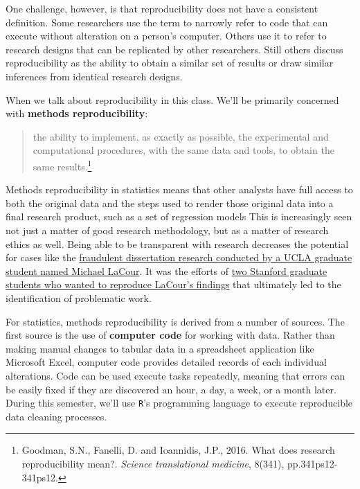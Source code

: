 \documentclass[]{book}
\let\rmarkdownfootnote\footnote%
\def\footnote{\protect\rmarkdownfootnote}
\theoremstyle{definition}
\theoremstyle{definition}
\theoremstyle{definition}
\theoremstyle{remark}
\begin{document}
One challenge, however, is that reproducibility does not have a
consistent definition. Some researchers use the term to narrowly refer
to code that can execute without alteration on a person's computer.
Others use it to refer to research designs that can be replicated by
other researchers. Still others discuss reproducibility as the ability
to obtain a similar set of results or draw similar inferences from
identical research designs.

When we talk about reproducibility in this class. We'll be primarily
concerned with \textbf{methods reproducibility}:

\begin{quote}
the ability to implement, as exactly as possible, the experimental and
computational procedures, with the same data and tools, to obtain the
same results.\footnote{Goodman, S.N., Fanelli, D. and Ioannidis, J.P.,
  2016. What does research reproducibility mean?. \emph{Science
  translational medicine}, 8(341), pp.341ps12-341ps12.}
\end{quote}

Methods reproducibility in statistics means that other analysts have
full access to both the original data and the steps used to render those
original data into a final research product, such as a set of regression
models This is increasingly seen not just a matter of good research
methodology, but as a matter of research ethics as well. Being able to
be transparent with research decreases the potential for cases like the
\href{http://nymag.com/scienceofus/2015/05/how-a-grad-student-uncovered-a-huge-fraud.html}{fraudulent
dissertation research conducted by a UCLA graduate student named Michael
LaCour}. It was the efforts of
\href{https://fivethirtyeight.com/features/how-two-grad-students-uncovered-michael-lacour-fraud-and-a-way-to-change-opinions-on-transgender-rights/}{two
Stanford graduate students who wanted to reproduce LaCour's findings}
that ultimately led to the identification of problematic work.

For statistics, methods reproducibility is derived from a number of
sources. The first source is the use of \textbf{computer code} for
working with data. Rather than making manual changes to tabular data in
a spreadsheet application like Microsoft Excel, computer code provides
detailed records of each individual alterations. Code can be used
execute tasks repeatedly, meaning that errors can be easily fixed if
they are discovered an hour, a day, a week, or a month later. During
this semester, we'll use \texttt{R}'s programming language to execute
reproducible data cleaning processes.
\end{document}

